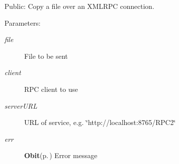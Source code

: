 Public: Copy a file over an XMLRPC connection. 

\begin{Desc}
\item[Parameters:]
\begin{description}
\item[{\em file}]File to be sent \item[{\em client}]RPC client to use \item[{\em server\-URL}]URL of service, e.g. \char`\"{}http://localhost:8765/RPC2\char`\"{} \item[{\em err}]{\bf Obit}{\rm (p.\,\pageref{structObit})} Error message \end{description}
\end{Desc}
